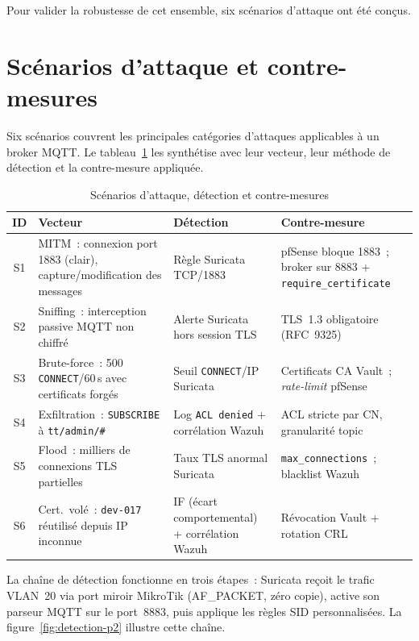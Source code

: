 Pour valider la robustesse de cet ensemble, six scénarios d'attaque ont été conçus.

\section{Scénarios d'attaque et contre-mesures}
\label{sec:re-attaques}

Six scénarios couvrent les principales catégories d'attaques applicables à un broker MQTT. Le tableau~\ref{tab:scenarios-attaque} les synthétise avec leur vecteur, leur méthode de détection et la contre-mesure appliquée.

\begin{table}[!htbp]
\centering
\caption{Scénarios d'attaque, détection et contre-mesures}
\label{tab:scenarios-attaque}
\footnotesize
\begin{tabularx}{\linewidth}{|c|>{\raggedright\arraybackslash}X|>{\raggedright\arraybackslash}X|>{\raggedright\arraybackslash}X|}
\hline
\textbf{ID} & \textbf{Vecteur} & \textbf{Détection} & \textbf{Contre-mesure} \\
\hline
S1 & MITM~: connexion port 1883 (clair), capture/modification des messages & Règle Suricata TCP/1883 & pfSense bloque 1883~; broker sur 8883 + \texttt{require\_certificate} \\ \hline
S2 & Sniffing~: interception passive MQTT non chiffré & Alerte Suricata hors session TLS & TLS~1.3 obligatoire (RFC~9325) \\ \hline
S3 & Brute-force~: 500 \texttt{CONNECT}/60\,s avec certificats forgés & Seuil \texttt{CONNECT}/IP Suricata & Certificats CA Vault~; \emph{rate-limit} pfSense \\ \hline
S4 & Exfiltration~: \texttt{SUBSCRIBE} à \texttt{tt/admin/\#} & Log \texttt{ACL denied} + corrélation Wazuh & ACL stricte par CN, granularité topic \\ \hline
S5 & Flood~: milliers de connexions TLS partielles & Taux TLS anormal Suricata & \texttt{max\_connections}~; blacklist Wazuh \\ \hline
S6 & Cert.\ volé~: \texttt{dev-017} réutilisé depuis IP inconnue & IF (écart comportemental) + corrélation Wazuh & Révocation Vault + rotation CRL \\ \hline
\end{tabularx}
\end{table}

La chaîne de détection fonctionne en trois étapes~: Suricata reçoit le trafic VLAN~20 via port miroir MikroTik (AF\_PACKET, zéro copie), active son parseur MQTT sur le port~8883, puis applique les règles SID personnalisées. La figure~\ref{fig:detection-p2} illustre cette chaîne.


